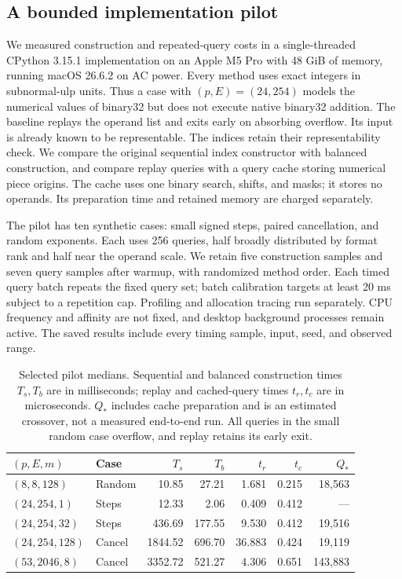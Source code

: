 \subsection{A bounded implementation pilot}\label{sec:pilot}

We measured construction and repeated-query costs in a single-threaded
CPython 3.15.1 implementation on an Apple M5 Pro with 48 GiB of memory,
running macOS 26.6.2 on AC power. Every method uses exact integers in
subnormal-ulp units. Thus a case with $(p,E)=(24,254)$ models the
numerical values of binary32 but does not execute native binary32
addition. The baseline replays the operand list and exits early on
absorbing overflow. Its input is already known to be representable.
The indices retain their representability check. We compare the original
sequential index constructor with balanced construction, and compare
replay queries with a query cache storing numerical piece origins.
The cache uses one binary search, shifts, and masks; it stores no operands.
Its preparation time and retained memory are charged separately.

The pilot has ten synthetic cases: small signed steps, paired cancellation,
and random exponents. Each uses 256 queries, half broadly distributed by
format rank and half near the operand scale. We retain five construction
samples and seven query samples after warmup, with randomized method order.
Each timed query batch repeats the fixed query set; batch calibration
targets at least 20 ms subject to a repetition cap. Profiling and allocation
tracing run separately. CPU frequency and affinity are not fixed, and
desktop background processes remain active. The saved results include
every timing sample, input, seed, and observed range.

\begin{table}[htbp]
\centering\small
\setlength{\tabcolsep}{4pt}
\begin{tabular}{llrrrrr}
\toprule
$(p,E,m)$ & Case & $T_s$ & $T_b$ & $t_r$ & $t_c$ & $Q_\ast$\\
\midrule
$(8,8,128)$ & Random & 10.85 & 27.21 & 1.681 & 0.215 & 18,563\\
$(24,254,1)$ & Steps & 12.33 & 2.06 & 0.409 & 0.412 & ---\\
$(24,254,32)$ & Steps & 436.69 & 177.55 & 9.530 & 0.412 & 19,516\\
$(24,254,128)$ & Cancel & 1844.52 & 696.70 & 36.883 & 0.424 & 19,119\\
$(53,2046,8)$ & Cancel & 3352.72 & 521.27 & 4.306 & 0.651 & 143,883\\
\bottomrule
\end{tabular}
\caption{Selected pilot medians. Sequential and balanced construction
times $T_s,T_b$ are in milliseconds; replay and cached-query times
$t_r,t_c$ are in microseconds. $Q_\ast$ includes cache preparation and is
an estimated crossover, not a measured end-to-end run. All queries in
the small random case overflow, and replay retains its early exit.}
\label{tab:pilot}
\end{table}

